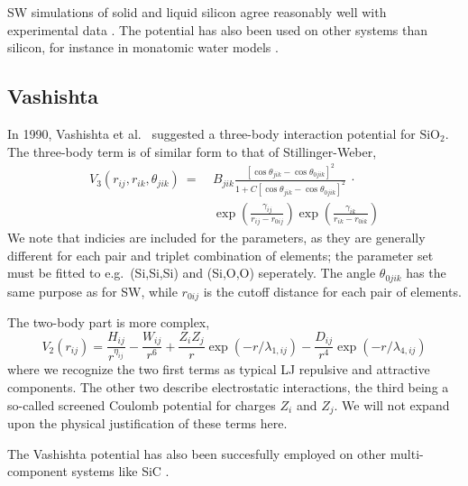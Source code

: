 \documentclass[twoside,english]{uiofysmaster}
\begin{document}
SW simulations of solid and liquid silicon agree reasonably well with experimental data \cite{Stillinger85}.
The potential has also been used on other systems than silicon, for instance in monatomic water models \cite{Molinero08}. 

\subsection{Vashishta}
In 1990, Vashishta et al.\ \cite{Vashishta90} suggested a three-body interaction potential for $\mathrm{SiO}_2$. 
The three-body term is of similar form to that of Stillinger-Weber, 
\begin{equation}
\begin{aligned}
 V_3(r_{ij}, r_{ik}, \theta_{jik}) \: = \:
 &B_{jik}\frac{[\cos\theta_{jik} - \cos\theta_{0jik}]^2}{1 + C[\cos\theta_{jik} - \cos\theta_{0jik}]^2} \: \cdot \\
 &\exp\left(\frac{\gamma_{ij}}{r_{ij} - r_{0ij}}\right)
 \exp\left(\frac{\gamma_{ik}}{r_{ik} - r_{0ik}}\right)
\end{aligned}
\end{equation}
We note that indicies are included for the parameters, as they are generally different for each pair and triplet combination
of elements; the parameter set must be fitted to e.g.\ (Si,Si,Si) and (Si,O,O) seperately. The angle $\theta_{0jik}$ has 
the same purpose as for SW, while $r_{0ij}$ is the cutoff distance for each pair of elements. 

\noindent The two-body part is more complex,
\begin{equation}
 V_2(r_{ij}) = \frac{H_{ij}}{r^{\eta_{ij}}} - \frac{W_{ij}}{r^6} + \frac{Z_iZ_j}{r}\exp(-r/\lambda_{1,ij}) - 
 \frac{D_{ij}}{r^4}\exp(-r/\lambda_{4,ij}) 
\end{equation}
where we recognize the two first terms as typical LJ repulsive and attractive components. The other two describe
electrostatic interactions, the third being a so-called screened Coulomb potential for charges $Z_i$ and $Z_j$. 
We will not expand upon the physical justification of these terms here. 

The Vashishta potential has also been succesfully employed on other multi-component systems like SiC \cite{Vashishta07}. 
\end{document}
